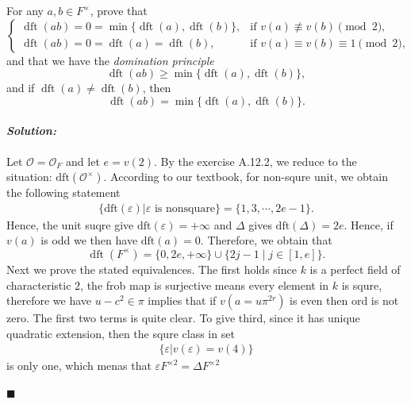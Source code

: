 \documentclass[12pt, a4paper]{article}
\newenvironment{solution}
  {\paragraph{\textit{Solution:}}\par\medskip}
  {\hfill$\blacksquare$\vspace{0.1cm}}
\begin{document}
For any $a,b\in F^\times$, prove that
\[
    \begin{cases}
        \operatorname{dft}(ab)=0
        =
        \min\{\operatorname{dft}(a),\operatorname{dft}(b)\},
        & \text{if } v(a)\not\equiv v(b)\pmod 2,\\
        \operatorname{dft}(ab)=0
        =
        \operatorname{dft}(a)=\operatorname{dft}(b),
        & \text{if } v(a)\equiv v(b)\equiv 1\pmod 2,
    \end{cases}
\]
and that we have the \emph{domination principle}
\[
    \operatorname{dft}(ab)
    \geq
    \min\{\operatorname{dft}(a),\operatorname{dft}(b)\},
\]
and if $\operatorname{dft}(a)\neq \operatorname{dft}(b)$, then
\[
    \operatorname{dft}(ab)
    =
    \min\{\operatorname{dft}(a),\operatorname{dft}(b)\}.
\]
\begin{solution}
    Let $\mathcal O=\mathcal O_F$ and let $e=v(2)$. 
    By the exercise A.12.2, we reduce to the situation: $\text{dft}(\mathcal{O}^\times)$.
    According to our textbook, for non-squre unit, we obtain the following statement
    \begin{align*}
        \{\text{dft}(\varepsilon)|\varepsilon\text{ is nonsquare}\}=\{1,3,\cdots,2e-1\}.
    \end{align*}
    Hence, the unit suqre give $\text{dft}(\varepsilon)=+\infty$ and $\Delta$ gives $\text{dft}(\Delta)=2e$. Hence, if $v(a)$ is odd we then have $\text{dft}(a)=0$.
    Therefore, we obtain that 
    \[
    \operatorname{dft}(F^\times)
    =
    \{0,2e,+\infty\}
    \cup
    \{2j-1\mid j\in [1,e]\}.
\]
    Next we prove the stated equivalences.
    The first holds since $k$ is a perfect field of characteristic $2$, the frob map is surjective means every element in $k$ is squre, therefore we have $u-c^2 \in \pi$ implies that if $v(a=u\pi^{2r})$ is even then ord is not zero.
    The first two terms is quite clear. To give third, since it has unique quadratic extension, then the squre class in set 
    \begin{align*}
        \{\varepsilon| v(\varepsilon)= v(4)\}
    \end{align*}
    is only one, which menas that $\varepsilon F^{\times 2} =\Delta F^{\times 2}$
    

\end{solution}
\end{document}
